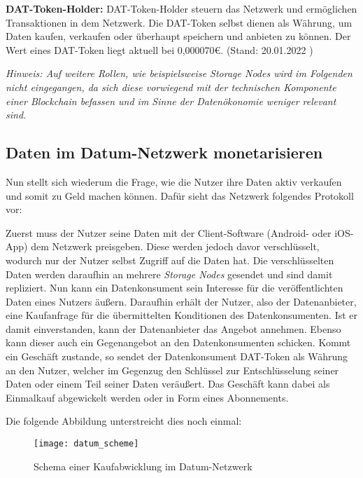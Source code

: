 \noindent \textbf{DAT-Token-Holder:} DAT-Token-Holder steuern das Netzwerk und ermöglichen Transaktionen in dem Netzwerk. Die DAT-Token selbst dienen als Währung, um Daten kaufen, verkaufen oder überhaupt speichern und anbieten zu können. Der Wert eines DAT-Token liegt aktuell bei 0,000070€. (Stand: 20.01.2022 \cite{DAT_Token_price}) \newline

\noindent \textit{Hinweis: Auf weitere Rollen, wie beispielsweise Storage Nodes wird im Folgenden nicht eingegangen, da sich diese vorwiegend mit der technischen Komponente einer Blockchain befassen und im Sinne der Datenökonomie weniger relevant sind.}

\subsection{Daten im Datum-Netzwerk monetarisieren}
Nun stellt sich wiederum die Frage, wie die Nutzer ihre Daten aktiv verkaufen und somit zu Geld machen können. Dafür sieht das Netzwerk folgendes Protokoll vor:\newline

\noindent Zuerst muss der Nutzer seine Daten mit der Client-Software (Android- oder iOS-App) dem Netzwerk preisgeben. Diese werden jedoch davor verschlüsselt, wodurch nur der Nutzer selbst Zugriff auf die Daten hat. Die verschlüsselten Daten werden daraufhin an mehrere \textit{Storage Nodes} gesendet und sind damit repliziert. Nun kann ein Datenkonsument sein Interesse für die veröffentlichten Daten eines Nutzers äußern. Daraufhin erhält der Nutzer, also der Datenanbieter, eine Kaufanfrage für die übermittelten Konditionen des Datenkonsumenten. Ist er damit einverstanden, kann der Datenanbieter das Angebot annehmen. Ebenso kann dieser auch ein Gegenangebot an den Datenkonsumenten schicken. Kommt ein Geschäft zustande, so sendet der Datenkonsument DAT-Token als Währung an den Nutzer, welcher im Gegenzug den Schlüssel zur Entschlüsselung seiner Daten oder einem Teil seiner Daten veräußert.
Das Geschäft kann dabei als Einmalkauf abgewickelt werden oder in Form eines Abonnements. \cite{datum_2017} \newline

\noindent Die folgende Abbildung unterstreicht dies noch einmal:

\begin{figure}[!ht]
	\centering
	\texttt{[image: datum\_scheme]}
	\caption{Schema einer Kaufabwicklung im Datum-Netzwerk \cite{datum_2017}}
	\label{fig:datumScheme}
\end{figure}
\FloatBarrier